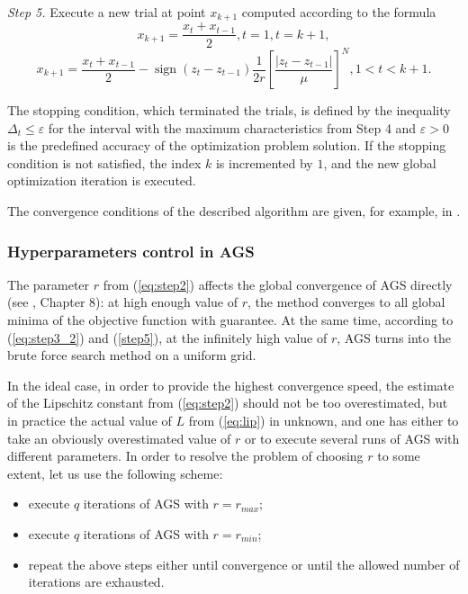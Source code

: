 \documentclass[runningheads]{llncs}
\DeclareMathOperator{\sign}{sign}
\begin{document}
\textit{Step 5.} Execute a new trial at point \(x_{k+1}\) computed according to the formula
\begin{displaymath}
x_{k+1}=\dfrac{x_{t}+x_{t-1}}{2},t=1,t=k+1,
\end{displaymath}
\begin{equation}
\label{step5}
x_{k+1}=\dfrac{x_{t}+x_{t-1}}{2}-\sign(z_{t}-z_{t-1})\dfrac{1}{2r}\left[\dfrac{|z_{t}-z_{t-1}|}{\mu}\right]^N,1<t<k+1.
\end{equation}

The stopping condition, which terminated the trials, is defined by the inequality
\(\Delta_{t}\leqslant \varepsilon\)
for the interval with the maximum characteristics from Step 4 and \(\varepsilon >0\) is the
predefined accuracy of the optimization problem solution. If the stopping condition is not satisfied,
the index \(k\) is incremented by \(1\), and the new global optimization iteration is executed.

The convergence conditions of the described algorithm are given, for example, in \cite{strSergGO}.

\subsubsection{Hyperparameters control in AGS}

The parameter $r$ from (\ref{eq:step2}) affects the global convergence of AGS directly (see
\cite{strSergGO}, Chapter 8):
at high enough value of $r$, the method converges to all global minima of the objective function with
guarantee.
At the same time, according to (\ref{eq:step3_2}) and (\ref{step5}), at the infinitely high value of $r$, AGS turns into
the brute force search method on a uniform grid.

In the ideal case, in order to provide the highest convergence speed, the estimate of the Lipschitz
constant from (\ref{eq:step2})
should not be too overestimated, but in practice the actual value of $L$ from (\ref{eq:lip}) in
unknown, and one has either to take an obviously overestimated value of $r$ or to execute several
runs of AGS with different parameters. In order to resolve the problem of choosing $r$ to some extent,
let us use the following scheme:
\begin{itemize}
  \item execute $q$ iterations of AGS with $r=r_{max}$;
  \item execute $q$ iterations of AGS with $r=r_{min}$;
  \item repeat the above steps either until convergence or until the allowed number of iterations are
exhausted.
\end{itemize}
\end{document}
